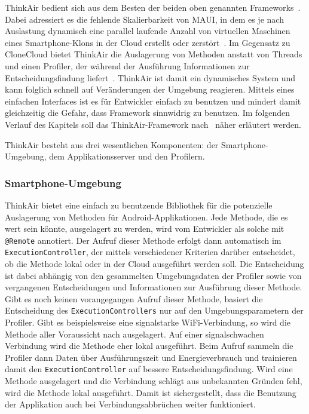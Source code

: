 \documentclass{sigchi}
\begin{document}
ThinkAir bedient sich aus dem Besten der beiden oben genannten Frameworks~\cite{thinkair}.
Dabei adressiert es die fehlende Skalierbarkeit von MAUI, in dem es je nach Auslastung dynamisch eine parallel laufende Anzahl von virtuellen Maschinen eines Smartphone-Klons in der Cloud erstellt oder zerstört~\cite{thinkair}.
Im Gegensatz zu CloneCloud bietet ThinkAir die Auslagerung von Methoden anstatt von Threads und einen Profiler, der während der Ausführung Informationen zur Entscheidungsfindung liefert~\cite{thinkair}.
ThinkAir ist damit ein dynamisches System und kann folglich schnell auf Veränderungen der Umgebung reagieren.
Mittels eines einfachen Interfaces ist es für Entwickler einfach zu benutzen und mindert damit gleichzeitig die Gefahr, dass Framework sinnwidrig zu benutzen.
Im folgenden Verlauf des Kapitels soll das ThinkAir-Framework nach~\cite{thinkair} näher erläutert werden. 

ThinkAir besteht aus drei wesentlichen Komponenten: der Smartphone-Umgebung, dem Applikationsserver und den Profilern.

\subsubsection{Smartphone-Umgebung}

ThinkAir bietet eine einfach zu benutzende Bibliothek für die potenzielle Auslagerung von Methoden für Android-Applikationen.
Jede Methode, die es wert sein könnte, ausgelagert zu werden, wird vom Entwickler als solche mit \texttt{@Remote} annotiert.
Der Aufruf dieser Methode erfolgt dann automatisch im \texttt{ExecutionController}, der mittels verschiedener Kriterien darüber entscheidet, ob die Methode lokal oder in der Cloud ausgeführt werden soll.
Die Entscheidung ist dabei abhängig von den gesammelten Umgebungsdaten der Profiler sowie von vergangenen Entscheidungen und Informationen zur Ausführung dieser Methode.
Gibt es noch keinen vorangegangen Aufruf dieser Methode, basiert die Entscheidung des \texttt{ExecutionControllers} nur auf den Umgebungsparametern der Profiler.
Gibt es beispielsweise eine signalstarke WiFi-Verbindung, so wird die Methode aller Voraussicht nach ausgelagert.
Auf einer signalschwachen Verbindung wird die Methode eher lokal ausgeführt.
Beim Aufruf sammeln die Profiler dann Daten über Ausführungszeit und Energieverbrauch und trainieren damit den \texttt{ExecutionController} auf bessere Entscheidungsfindung.
Wird eine Methode ausgelagert und die Verbindung schlägt aus unbekannten Gründen fehl, wird die Methode lokal ausgeführt.
Damit ist sichergestellt, dass die Benutzung der Applikation auch bei Verbindungsabbrüchen weiter funktioniert.
\end{document}
